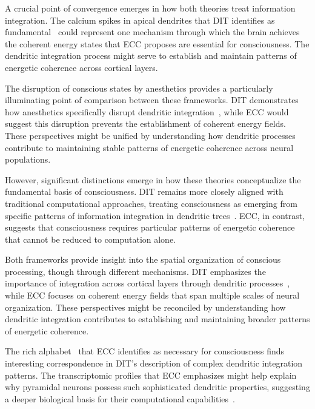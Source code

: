 A crucial point of convergence emerges in how both theories treat information integration. The calcium spikes in apical dendrites that DIT identifies as fundamental~\cite{Major2013, Polsky2004} could represent one mechanism through which the brain achieves the coherent energy states that ECC proposes are essential for consciousness. The dendritic integration process might serve to establish and maintain patterns of energetic coherence across cortical layers.

The disruption of conscious states by anesthetics provides a particularly illuminating point of comparison between these frameworks. DIT demonstrates how anesthetics specifically disrupt dendritic integration~\cite{Suzuki2020, Aru2019}, while ECC would suggest this disruption prevents the establishment of coherent energy fields. These perspectives might be unified by understanding how dendritic processes contribute to maintaining stable patterns of energetic coherence across neural populations.

However, significant distinctions emerge in how these theories conceptualize the fundamental basis of consciousness. DIT remains more closely aligned with traditional computational approaches, treating consciousness as emerging from specific patterns of information integration in dendritic trees~\cite{Larkum2013, Beniaguev2021}. ECC, in contrast, suggests that consciousness requires particular patterns of energetic coherence that cannot be reduced to computation alone.

Both frameworks provide insight into the spatial organization of conscious processing, though through different mechanisms. DIT emphasizes the importance of integration across cortical layers through dendritic processes~\cite{Phillips2018, Stuart2015}, while ECC focuses on coherent energy fields that span multiple scales of neural organization. These perspectives might be reconciled by understanding how dendritic integration contributes to establishing and maintaining broader patterns of energetic coherence.

The rich alphabet~ that ECC identifies as necessary for consciousness finds interesting correspondence in DIT's description of complex dendritic integration patterns. The transcriptomic profiles that ECC emphasizes might help explain why pyramidal neurons possess such sophisticated dendritic properties, suggesting a deeper biological basis for their computational capabilities~\cite{Aru2019, TranVanMinh2015}.

